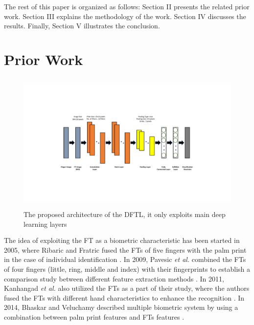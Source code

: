 \documentclass[conference]{IEEEtran}
\begin{document}
The rest of this paper is organized as follows: Section II presents the related prior work. Section III explains the methodology of the work. Section IV discusses the results. Finally, Section V illustrates the conclusion.

\section{Prior Work}
\begin{figure}[!t]
    \centering
    \includegraphics[page=1,height=7cm,width=20cm,trim=5cm 4cm 3cm 4cm,clip]{DFTL.pdf}
    \caption{The proposed architecture of the DFTL, it only exploits main deep learning layers}
    \label{fig:DFTL}
\end{figure}
The idea of exploiting the FT as a biometric characteristic has been started in 2005, where Ribaric and Fratric fused the FTs of five fingers with the palm print in the case of individual identification \cite{Ribaric2005ABiometric}. In 2009, Pavesic \textit{et al.} combined the FTs of four fingers (little, ring, middle and index) with their fingerprints to establish a comparison study between different feature extraction methods \cite{Pavesic2009Finger-based}. In 2011, Kanhangad \textit{et al.} also utilized the FTs as a part of their study, where the authors fused the FTs with different hand characteristics to enhance the recognition \cite{Kanhangad2011AUnified}. In 2014, Bhaskar and Veluchamy described multiple biometric system by using a combination between palm print features and FTs features \cite{Bhaskar2014Hand}. 
\end{document}
